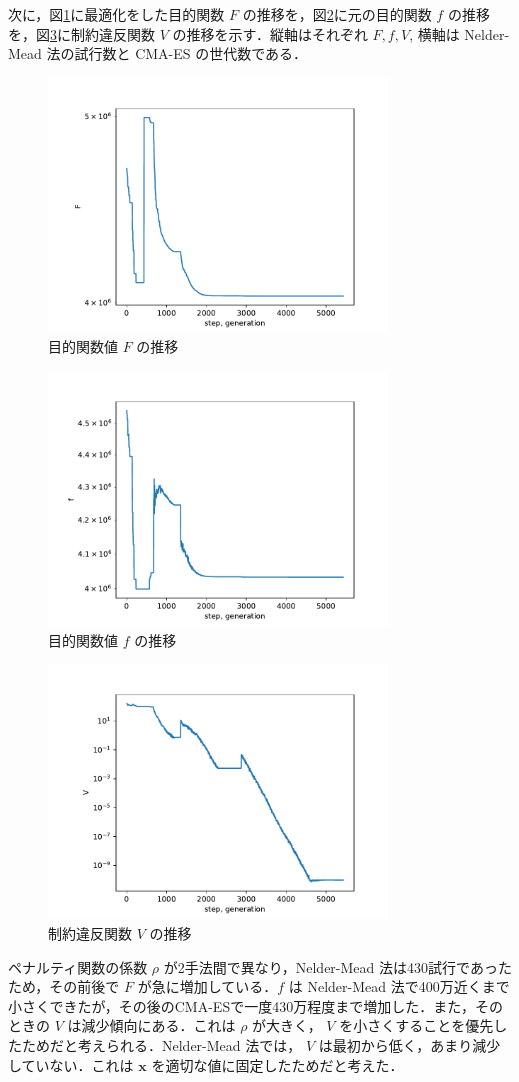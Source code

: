 \documentclass[twocolumn]{jarticle}
\begin{document}
次に，図\ref{img_F}に最適化をした目的関数 $F$ の推移を，図\ref{img_f}に元の目的関数 $f$ の推移を，図\ref{img_V}に制約違反関数 $V$ の推移を示す．縦軸はそれぞれ $F, f, V$, 横軸は Nelder-Mead 法の試行数と CMA-ES の世代数である．
\begin{figure}
    \centering
    \includegraphics[width=9cm]{img_F.pdf}
    \caption{目的関数値 $F$ の推移}
    \label{img_F}
\end{figure}
\begin{figure}
    \centering
    \includegraphics[width=9cm]{img_f.pdf}
    \caption{目的関数値 $f$ の推移}
    \label{img_f}
\end{figure}
\begin{figure}
    \centering
    \includegraphics[width=9cm]{img_V.pdf}
    \caption{制約違反関数 $V$ の推移} 
    \label{img_V}
\end{figure}
ペナルティ関数の係数 $\rho$ が2手法間で異なり，Nelder-Mead 法は430試行であったため，その前後で $F$ が急に増加している．$f$ は Nelder-Mead 法で400万近くまで小さくできたが，その後のCMA-ESで一度430万程度まで増加した．また，そのときの $V$ は減少傾向にある．これは  $\rho$ が大きく， $V$ を小さくすることを優先したためだと考えられる．Nelder-Mead 法では， $V$ は最初から低く，あまり減少していない．これは $\bm{x}$ を適切な値に固定したためだと考えた．
\end{document}
